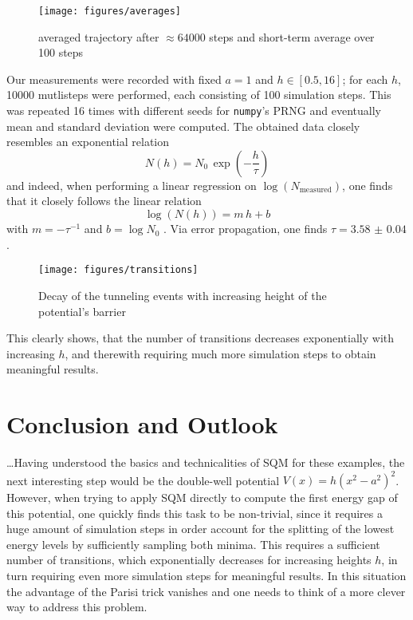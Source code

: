 \begin{figure}[h]
    \centering
    \texttt{[image: figures/averages]}
    \caption{averaged trajectory after $\approx\num{64000}$ steps and
    short-term average over \num{100} steps}
    \label{fig:avg}
\end{figure}

Our measurements were recorded with fixed $a=1$ and $h\in[0.5,16]$; for each
$h$, \num{10000} mutlisteps were performed, each consisting of 100 simulation
steps. This was repeated 16 times with different seeds for \texttt{numpy}'s
PRNG and eventually mean and standard deviation were computed. The obtained
data closely resembles an exponential relation
\begin{equation*}
    N(h)=N_0\,\exp\left(-\frac{h}{\tau}\right)
\end{equation*}
and indeed, when performing a linear regression on
$\log(N_{\mathrm{measured}})$, one finds that it closely follows the linear
relation
\begin{equation*}
    \log\left(N(h)\right)=m\,h+b
\end{equation*}
with $m=-\tau^{-1}$ and $b=\log{N_0}$ . Via error
propagation, one finds
$\tau=\num{3.58(4)}$.

\begin{figure}[h]
    \centering
    \texttt{[image: figures/transitions]}
    \caption{Decay of the tunneling events with increasing height of the potential's barrier}
    \label{fig:transitions}
\end{figure}

This clearly shows, that the number of transitions decreases exponentially with
increasing $h$, and therewith requiring much more simulation steps to obtain
meaningful results.


\newpage

\section{Conclusion and Outlook}
\dots Having understood the basics and technicalities of SQM for these
examples, the next interesting step would be the double-well potential
$V(x)=h\left(x^2-a^2\right)^2$.
However, when trying to apply SQM directly to compute the first energy gap of
this potential, one quickly finds this task to be non-trivial, since it
requires a huge amount of simulation steps in order account for the splitting
of the lowest energy levels by sufficiently sampling both minima. This requires
a sufficient number of transitions, which exponentially decreases for
increasing heights $h$, in turn requiring even more simulation steps for
meaningful results. In this situation the advantage of the Parisi trick
vanishes and one needs to think of a more clever way to address this problem.

